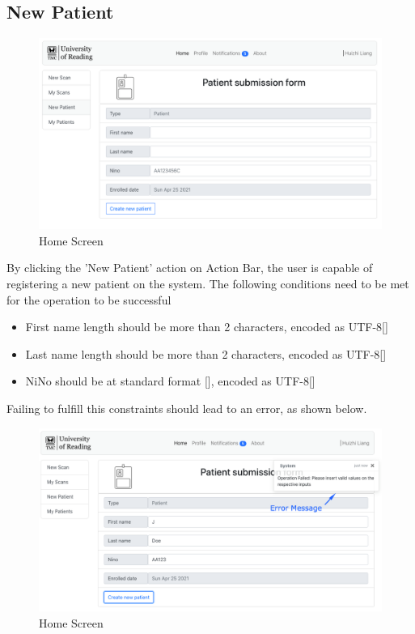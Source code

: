 		\subsection{New Patient}
			\begin{figure}[H]
				\iftrue
				\centering
				\caption{Home Screen}
				\includegraphics[scale=0.3]{figures/newpatient}
				\fi
			\end{figure}
			By clicking the 'New Patient' action on Action Bar, the user is capable of registering a new patient on the system. The following
			conditions need to be met for the operation to be successful
			\begin{itemize}
				\item First name length should be more than 2 characters, encoded as UTF-8[\cite{rfc3629}]
				\item Last name length should be more than 2 characters, encoded as UTF-8[\cite{rfc3629}]
				\item NiNo should be at standard format [\cite{nino-format}], encoded as UTF-8[\cite{rfc3629}]
			\end{itemize}
			Failing to fulfill this constraints should lead to an error, as shown below.
			\begin{figure}[H]
				\iftrue
				\centering
				\caption{Home Screen}
				\includegraphics[scale=0.3]{figures/newpatient-error}
				\fi
			\end{figure}
			
			
			
			
		
	



